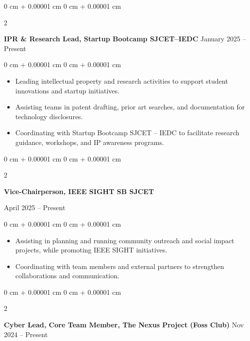 \documentclass[10pt, letterpaper]{article}
\newenvironment{highlights}{
    \begin{itemize}[
        topsep=0.10 cm,
        parsep=0.10 cm,
        partopsep=0pt,
        itemsep=0pt,
        leftmargin=0 cm + 10pt
    ]
}{
    \end{itemize}
} %
\newenvironment{onecolentry}{
    \begin{adjustwidth}{
        0 cm + 0.00001 cm
    }{
        0 cm + 0.00001 cm
    }
}{
    \end{adjustwidth}
} %
\newenvironment{twocolentry}[2][]{
    \onecolentry
    \def\secondColumn{#2}
    \setcolumnwidth{\fill, 4.5 cm}
    \begin{paracol}{2}
}{
    \switchcolumn \raggedleft \secondColumn
    \end{paracol}
    \endonecolentry
} %
\begin{document}
\begin{twocolentry}{
            January 2025 – Present
        }
            \textbf{IPR \& Research Lead, Startup Bootcamp SJCET–IEDC}\end{twocolentry}

        \vspace{0.10 cm}
        \begin{onecolentry}
            \begin{highlights}
                \item Leading intellectual property and research activities to support student innovations and startup initiatives.
                \item Assisting teams in patent drafting, prior art searches, and documentation for technology disclosures.
                \item Coordinating with Startup Bootcamp SJCET – IEDC to facilitate research guidance, workshops, and IP awareness programs.

            \end{highlights}
        \end{onecolentry}

        \vspace{0.2 cm}

\begin{twocolentry}{
            April 2025 – Present
        }
            \textbf{Vice-Chairperson, IEEE SIGHT SB SJCET}
        \end{twocolentry}

        \vspace{0.10 cm}
        \begin{onecolentry}
            \begin{highlights}
                \item Assisting in planning and running community outreach and social impact projects, while promoting IEEE SIGHT initiatives.  
                \item Coordinating with team members and external partners to strengthen collaborations and communication.  
            \end{highlights}
        \end{onecolentry}

        \vspace{0.2 cm}

 \begin{twocolentry}{
            Nov 2024 – Present
        }
            \textbf{Cyber Lead, Core Team Member, The Nexus Project (Foss Club)}\end{twocolentry}
\end{document}
